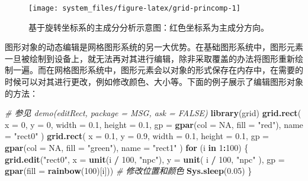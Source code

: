 \documentclass[
  b5paper,
  UTF8,twoside]{book}
\newenvironment{Shaded}{\begin{snugshade}}{\end{snugshade}}
\newcommand{\AttributeTok}[1]{\textcolor[rgb]{0.13,0.29,0.53}{#1}}
\newcommand{\CommentTok}[1]{\textcolor[rgb]{0.56,0.35,0.01}{\textit{#1}}}
\newcommand{\ConstantTok}[1]{\textcolor[rgb]{0.56,0.35,0.01}{#1}}
\newcommand{\ControlFlowTok}[1]{\textcolor[rgb]{0.13,0.29,0.53}{\textbf{#1}}}
\newcommand{\DecValTok}[1]{\textcolor[rgb]{0.00,0.00,0.81}{#1}}
\newcommand{\FloatTok}[1]{\textcolor[rgb]{0.00,0.00,0.81}{#1}}
\newcommand{\FunctionTok}[1]{\textcolor[rgb]{0.13,0.29,0.53}{\textbf{#1}}}
\newcommand{\NormalTok}[1]{#1}
\newcommand{\SpecialCharTok}[1]{\textcolor[rgb]{0.81,0.36,0.00}{\textbf{#1}}}
\newcommand{\StringTok}[1]{\textcolor[rgb]{0.31,0.60,0.02}{#1}}
\begin{document}
\begin{figure}

{\centering \texttt{[image: system\_files/figure-latex/grid-princomp-1]} 

}

\caption[基于旋转坐标系的主成分分析示意图]{基于旋转坐标系的主成分分析示意图：红色坐标系为主成分方向。}\label{fig:grid-princomp}
\end{figure}



图形对象的动态编辑是网格图形系统的另一大优势。在基础图形系统中，图形元素一旦被绘制到设备上，就无法再对其进行编辑，除非采取覆盖的办法将图形重新绘制一遍。而在网格图形系统中，图形元素会以对象的形式保存在内存中，在需要的时候可以对其进行更改，例如修改颜色、大小等。下面的例子展示了编辑图形对象的方法：

\begin{Shaded}
\begin{Highlighting}[]
\CommentTok{\# 参见 demo(\textquotesingle{}editRect\textquotesingle{}, package = \textquotesingle{}MSG\textquotesingle{}, ask = FALSE)}
\FunctionTok{library}\NormalTok{(grid)}
\FunctionTok{grid.rect}\NormalTok{(}
  \AttributeTok{x =} \DecValTok{0}\NormalTok{, }\AttributeTok{y =} \DecValTok{0}\NormalTok{, }\AttributeTok{width =} \FloatTok{0.1}\NormalTok{, }\AttributeTok{height =} \FloatTok{0.1}\NormalTok{,}
  \AttributeTok{gp =} \FunctionTok{gpar}\NormalTok{(}\AttributeTok{col =} \ConstantTok{NA}\NormalTok{, }\AttributeTok{fill =} \StringTok{"red"}\NormalTok{), }\AttributeTok{name =} \StringTok{"rect0"}
\NormalTok{)}
\FunctionTok{grid.rect}\NormalTok{(}
  \AttributeTok{x =} \FloatTok{0.1}\NormalTok{, }\AttributeTok{y =} \FloatTok{0.9}\NormalTok{, }\AttributeTok{width =} \FloatTok{0.1}\NormalTok{, }\AttributeTok{height =} \FloatTok{0.1}\NormalTok{,}
  \AttributeTok{gp =} \FunctionTok{gpar}\NormalTok{(}\AttributeTok{col =} \ConstantTok{NA}\NormalTok{, }\AttributeTok{fill =} \StringTok{"green"}\NormalTok{), }\AttributeTok{name =} \StringTok{"rect1"}
\NormalTok{)}
\ControlFlowTok{for}\NormalTok{ (i }\ControlFlowTok{in} \DecValTok{1}\SpecialCharTok{:}\DecValTok{100}\NormalTok{) \{}
  \FunctionTok{grid.edit}\NormalTok{(}\StringTok{"rect0"}\NormalTok{, }\AttributeTok{x =} \FunctionTok{unit}\NormalTok{(i }\SpecialCharTok{/} \DecValTok{100}\NormalTok{, }\StringTok{"npc"}\NormalTok{), }\AttributeTok{y =} \FunctionTok{unit}\NormalTok{(}
\NormalTok{    i }\SpecialCharTok{/} \DecValTok{100}\NormalTok{,}
    \StringTok{"npc"}
\NormalTok{  ), }\AttributeTok{gp =} \FunctionTok{gpar}\NormalTok{(}\AttributeTok{fill =} \FunctionTok{rainbow}\NormalTok{(}\DecValTok{100}\NormalTok{)[i])) }\CommentTok{\# 修改位置和颜色}
  \FunctionTok{Sys.sleep}\NormalTok{(}\FloatTok{0.05}\NormalTok{)}
\NormalTok{\}}
\end{Highlighting}
\end{Shaded}
\end{document}
